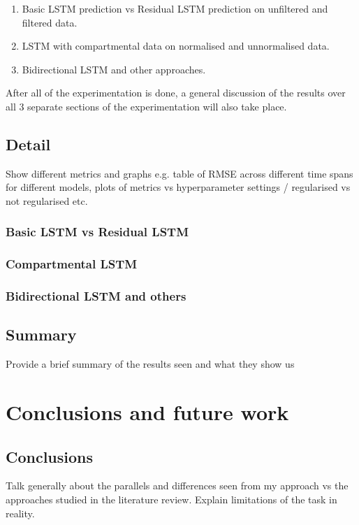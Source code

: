       \begin{enumerate}
        \item Basic LSTM prediction vs Residual LSTM prediction on unfiltered and filtered data.
        \item LSTM with compartmental data on normalised and unnormalised data.
        \item Bidirectional LSTM and other approaches.

      \end{enumerate}
	
      After all of the experimentation is done, a general discussion of the results over all 3 separate sections of the experimentation will also take place.

	\subsection{Detail}
        Show different metrics and graphs e.g. table of RMSE across different time spans for different models, plots of metrics vs hyperparameter settings / regularised vs not regularised etc.
    
    \subsubsection{Basic LSTM vs Residual LSTM}

    \subsubsection{Compartmental LSTM}

    \subsubsection{Bidirectional LSTM and others}
	
	\subsection{Summary}
        Provide a brief summary of the results seen and what they show us



\section{Conclusions and future work} %
    \subsection{Conclusions}
        Talk generally about the parallels and differences seen from my approach vs the approaches studied in the literature review. Explain limitations of the task in reality.
	
